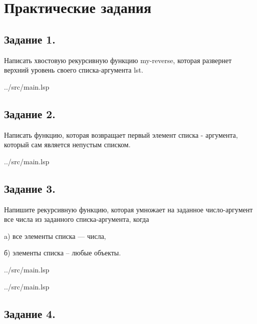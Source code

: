 \chapter{Практические задания}

\section*{Задание 1.}

Написать хвостовую рекурсивную функцию my-reverse, которая развернет верхний уровень своего списка-аргумента lst.

\begin{lstinputlisting}[
	caption={Задание 1},
	label={lst:t1},
	style={lsp},
	linerange={1-6},
	]{../src/main.lsp}
\end{lstinputlisting}

\section*{Задание 2.}

Написать функцию, которая возвращает первый элемент списка - аргумента, который сам является непустым списком.

\begin{lstinputlisting}[
	caption={Задание 2},
	label={lst:t2},
	style={lsp},
	linerange={8-13},
	]{../src/main.lsp}
\end{lstinputlisting}

\section*{Задание 3.}
Напишите рекурсивную функцию, которая умножает на заданное число-аргумент все числа из заданного списка-аргумента, когда
  
a) все элементы списка --- числа,

б) элементы списка -- любые объекты.

\begin{lstinputlisting}[
	caption={Задание 3, a},
	label={lst:t3-1},
	style={lsp},
	linerange={24-30},
	]{../src/main.lsp}
\end{lstinputlisting}

\clearpage

\begin{lstinputlisting}[
	caption={Задание 3, b},
	label={lst:t3-2},
	style={lsp},
	linerange={32-37},
	]{../src/main.lsp}
\end{lstinputlisting}


\section*{Задание 4.}

